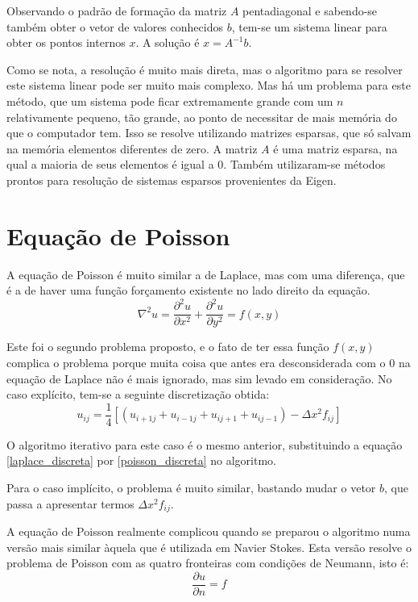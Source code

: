 \documentclass[journal]{IEEEtran}
\begin{document}
Observando o padrão de formação da matriz $A$ pentadiagonal e sabendo-se também obter o vetor de valores conhecidos $b$, tem-se um sistema linear para obter os pontos internos $x$. A solução é $x=A^{-1}b$.

Como se nota, a resolução é muito mais direta, mas o algoritmo para se resolver este sistema linear pode ser muito mais complexo. Mas há um problema para este método, que um sistema pode ficar extremamente grande com um $n$ relativamente pequeno, tão grande, ao ponto de necessitar de mais memória do que o computador tem. Isso se resolve utilizando matrizes esparsas, que só salvam na memória elementos diferentes de zero. A matriz $A$ é uma matriz esparsa, na qual a maioria de seus elementos é igual a 0. Também utilizaram-se métodos prontos para resolução de sistemas esparsos provenientes da Eigen.
\section{Equação de Poisson}

A equação de Poisson é muito similar a de Laplace, mas com uma diferença, que é a de haver uma função forçamento existente no lado direito da equação.
\begin{equation}
  \nabla^2 u=\frac{\partial^2 u}{\partial x^2}+\frac{\partial^2 u}{\partial y^2}=f(x,y)\label{poisson}
\end{equation}

Este foi o segundo problema proposto, e o fato de ter essa função $f(x,y)$ complica o problema porque muita coisa que antes era desconsiderada com o $0$ na equação de Laplace não é mais ignorado, mas sim levado em consideração. No caso explícito, tem-se a seguinte discretização obtida:
\begin{equation}
u_{ij}=\frac{1}{4}[(u_{i+1j}+u_{i-1j}+u_{ij+1}+u_{ij-1})-\Delta x^2 f_{ij}] \label{poisson_discreta}
\end{equation}

O algoritmo iterativo para este caso é o mesmo anterior, substituindo a equação \ref{laplace_discreta} por \ref{poisson_discreta} no algoritmo.

Para o caso implícito, o problema é muito similar, bastando mudar o vetor $b$, que passa a apresentar termos $\Delta x^2 f_{ij}$.

A equação de Poisson realmente complicou quando se preparou o algoritmo numa versão mais similar àquela que é utilizada em Navier Stokes. Esta versão resolve o problema de Poisson com as quatro fronteiras com condições de Neumann, isto é:
\begin{equation}
\frac{\partial u}{\partial n} = f
\end{equation}
\end{document}
